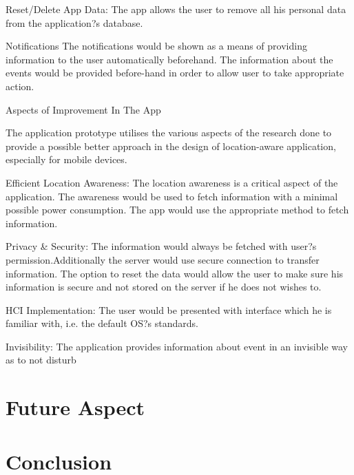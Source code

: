 \documentclass[12pt]{report}
\begin{document}
Reset/Delete App Data: The app allows the user to remove all his personal data from the application?s database.


Notifications
The notifications would be shown as a means of providing information to the user automatically beforehand. The information about the events would be provided before-hand in order to allow user to take appropriate action.


Aspects of Improvement In The App

The application prototype utilises the various aspects of the research done to provide a possible better approach in the design of location-aware application, especially for mobile devices.


Efficient Location Awareness: The location awareness is a critical aspect of the application. The awareness would be used to fetch information with a minimal possible power consumption. The app would use the appropriate method to fetch information.


Privacy \& Security: The information would always be fetched with user?s permission.Additionally the server would use secure connection to transfer information. The option to reset the data would allow the user to make sure his information is secure and not stored on the server if he does not wishes to.


HCI Implementation: The user would be presented with interface which he is familiar with, i.e. the default OS?s standards. 


Invisibility: The application provides information about event in an invisible way as to not disturb

\section{Future Aspect}
\section{Conclusion}



\end{document}
